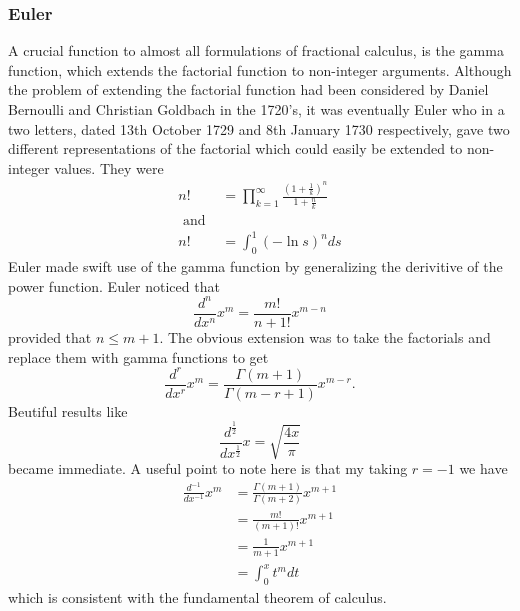 \documentclass{unswmaths}
\begin{document}
\subsubsection{Euler}
A crucial function to almost all formulations of fractional calculus, is the gamma function, which extends the factorial function
to non-integer arguments. Although the problem of extending the factorial function had been considered by Daniel Bernoulli and Christian Goldbach in the 1720's, it was eventually Euler who in a two letters, dated 13th October 1729 
and 8th January 1730 respectively, gave two different representations of the factorial which could easily be extended
to non-integer values.
They were
\begin{align*}
	n! &= \prod_{k=1}^\infty \frac{\left( 1 + \frac{1}{k} \right)^n}{1 + \frac{n}{k}} \\
	\text{ and } \\
	n! &= \int_0^1 (-\ln s)^n ds 
\end{align*}
Euler made swift use of the gamma function by generalizing the derivitive of the power function.
Euler noticed that 
$$
	\frac{d^n}{dx^n} x^m = \frac{m!}{n+1!} x^{m - n}
$$
provided that $ n \leq m + 1 $.
The obvious extension was to take the factorials and replace them with gamma functions to get
$$
    \frac{d^r}{dx^r} x^m = \frac{\Gamma (m+1)}{\Gamma (m - r + 1)} x^{m-r}.
$$
Beutiful results like 
$$
    \frac{d^\frac{1}{2}}{dx^\frac{1}{2}} x = \sqrt{\frac{4x}{\pi}}
$$
became immediate. 
A useful point to note here is that my taking $ r = -1 $ we have
\begin{align*}
    \frac{d^{-1}}{dx^{-1}} x^m  &= \frac{\Gamma(m+1)}{\Gamma(m + 2)} x^{m + 1} \\
                                &= \frac{m!}{(m+1)!}x^{m+1} \\
                                &= \frac{1}{m+1} x^{m+1} \\
                                &= \int_0^x t^m dt
\end{align*}
which is consistent with the fundamental theorem of calculus.
\end{document}
